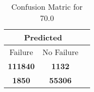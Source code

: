 \begin{table}[] 
\caption{Confusion Matric for 70.0} 
\label{Table: Prediction Accuracy-DMD70.0OnlySunEKF-combinationReflectionEKF-top2perfectNoFailurePrediction-Reflection} 
\centering 
\begin{tabular} 
 {@{}ccc@{}} 
\toprule 
\multicolumn{2}{c}{\textbf{Predicted}}
 \\ \midrule 
\multicolumn{1}{|c|}{Failure} & 
\multicolumn{1}{c|}{No Failure}
 \\ \midrule 
\multicolumn{1}{|c|}{\color{green}\textbf{111840}} & 
\multicolumn{1}{c|}{\color{red}\textbf{1132}}
 \\ \midrule 
\multicolumn{1}{|c|}{\color{red}\textbf{1850}} & 
\multicolumn{1}{c|}{\color{green}\textbf{55306}}
 \\ \bottomrule 
\end{tabular} 
\end{table} 
